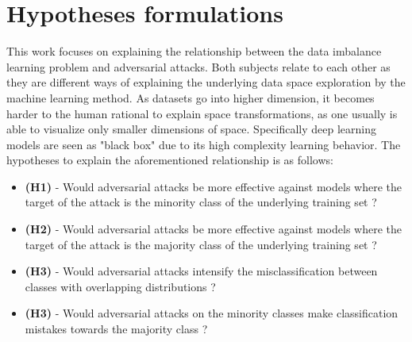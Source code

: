 \section{Hypotheses formulations}
This work focuses on explaining the relationship between the data imbalance learning problem and adversarial attacks. Both subjects relate to each other as they are different ways of explaining the underlying data space exploration by the machine learning method. As datasets go into higher dimension, it becomes harder to the human rational to explain space transformations, as one usually is able to visualize only smaller dimensions of space. Specifically deep learning models are seen as "black box" due to its high complexity learning behavior. The hypotheses to explain the aforementioned relationship is as follows:

\begin{itemize}
	\item \textbf{(H1)} - Would adversarial attacks be more effective against models where the target of the attack is the minority class of the underlying training set ?
	\item \textbf{(H2)} - Would adversarial attacks be more effective against models where the target of the attack is the majority class of the underlying training set ?
	\item \textbf{(H3)} - Would adversarial attacks intensify the misclassification between classes with overlapping distributions ?
	\item \textbf{(H3)} - Would adversarial attacks on the minority classes make classification mistakes towards the majority class ?
\end{itemize}
